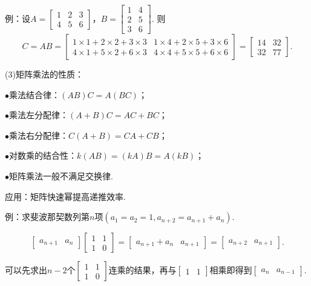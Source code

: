 \documentclass[a4paper]{article}
\newcommand{\hei}{\CJKfamily{hei}}
\def\dou{，\!\!}
\begin{document}
    例：\!\!设$A=
        \begin{bmatrix}
            1 & 2 & 3 \\
            4 & 5 & 6
        \end{bmatrix}
    $\dou $B=
        \begin{bmatrix}
            1 & 4 \\
            2 & 5 \\
            3 & 6
        \end{bmatrix}
    $. 则$$C=AB=
        \begin{bmatrix}
            1\times 1+2\times 2+3\times 3 & 1\times 4+2\times 5+3\times 6 \\
            4\times 1+5\times 2+6\times 3 & 4\times 4+5\times 5+6\times 6
        \end{bmatrix}
    =
        \begin{bmatrix}
            14 & 32 \\
            32 & 77
        \end{bmatrix}.$$

    (3)矩阵乘法的性质：\!\!

    $\bullet$乘法结合律：\!\!$(AB)C=A(BC)$；\!\!

    $\bullet$乘法左分配律：\!\!$(A+B)C=AC+BC$；\!\!

    $\bullet$乘法右分配律：\!\!$C(A+B)=CA+CB$；\!\!

    $\bullet$对数乘的结合性：\!\!$k(AB)=(kA)B=A(kB)$；\!\!

    $\bullet$矩阵乘法一般{\hei 不满足交换律}.

    {\hei 应用：\!\!}矩阵快速幂提高递推效率.

    例：\!\!求斐波那契数列第$n$项$(a_1=a_2=1,a_{n+2}=a_{n+1}+a_n)$.

    $$\begin{bmatrix}
        a_{n+1} & a_n
    \end{bmatrix}
    \begin{bmatrix}
        1 & 1 \\
        1 & 0
    \end{bmatrix}
    =
    \begin{bmatrix}
        a_{n+1}+a_n & a_{n+1}
    \end{bmatrix}
    =
    \begin{bmatrix}
        a_{n+2} & a_{n+1}
    \end{bmatrix}.$$

    可以先求出$n-2$个$
    \begin{bmatrix}
        1 & 1 \\
        1 & 0
    \end{bmatrix}$连乘的结果\dou 再与$
    \begin{bmatrix}
        1 & 1
    \end{bmatrix}$相乘即得到$
    \begin{bmatrix}
        a_n & a_{n-1}
    \end{bmatrix}$.
\end{document}
